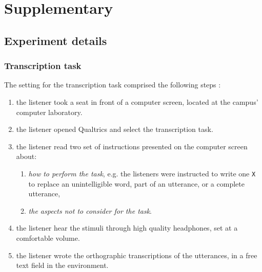 \section{Supplementary}

\subsection{Experiment details}
%
\subsubsection{Transcription task} \label{appA:transcription}
%
The setting for the transcription task comprised the following steps \citep{Boonen_et_al_2020, Boonen_et_al_2021}:
%
\begin{enumerate} %
	\item the listener took a seat in front of a computer screen, located at the campus' computer laboratory.
	\item the listener opened Qualtrics \cite{Qualtrics_2005} and select the transcription task.
	\item the listener read two set of instructions presented on the computer screen about:
	\begin{enumerate}
		\item \textit{how to perform the task}, e.g. the listeners were instructed to write one \texttt{X} to replace an unintelligible word, part of an utterance, or a complete utterance,
		\item \textit{the aspects not to consider for the task}.
	\end{enumerate}
	\item the listener hear the stimuli through high quality headphones, set at a comfortable volume.
	\item the listener wrote the orthographic transcriptions of the utterances, in a free text field in the environment. 
\end{enumerate}
%
%
